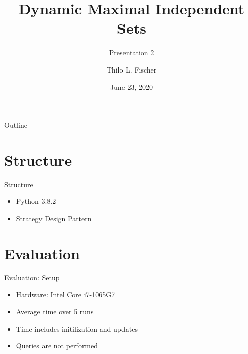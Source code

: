 \documentclass{beamer}
\title{Dynamic Maximal Independent Sets}
\subtitle{Presentation 2}
\author{Thilo L. Fischer}
\date{June 23, 2020}
\begin{document}
\begin{frame}
  \titlepage
\end{frame}

\begin{frame}{Outline}
  \tableofcontents
\end{frame}

\section{Structure}
\begin{frame}{Structure}

  \begin{itemize}
    \item Python 3.8.2
    \item Strategy Design Pattern
  \end{itemize}

  \pause

  \begin{center}
  \end{center}
\end{frame}

\section{Evaluation}

\begin{frame}{Evaluation: Setup}
  \begin{itemize}
    \item Hardware: Intel Core i7-1065G7
    \item Average time over 5 runs
    \item Time includes initilization and updates
    \item Queries are not performed
      \bigskip
  \end{itemize}
\end{frame}
\end{document}
